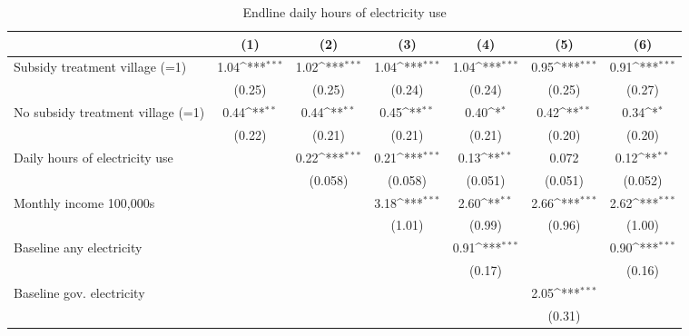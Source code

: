 \begin{table}[htbp]\centering
\def\sym#1{\ifmmode^{#1}\else\(^{#1}\)\fi}
\caption{Endline daily hours of electricity use}
\begin{tabular*}{1\hsize}{@{\hskip\tabcolsep\extracolsep\fill}l*{6}{c}}
\toprule
                &\multicolumn{1}{c}{(1)}         &\multicolumn{1}{c}{(2)}         &\multicolumn{1}{c}{(3)}         &\multicolumn{1}{c}{(4)}         &\multicolumn{1}{c}{(5)}         &\multicolumn{1}{c}{(6)}         \\
\midrule
Subsidy treatment village (=1)&     1.04\sym{***}&     1.02\sym{***}&     1.04\sym{***}&     1.04\sym{***}&     0.95\sym{***}&     0.91\sym{***}\\
                &   (0.25)         &   (0.25)         &   (0.24)         &   (0.24)         &   (0.25)         &   (0.27)         \\
No subsidy treatment village (=1)&     0.44\sym{**} &     0.44\sym{**} &     0.45\sym{**} &     0.40\sym{*}  &     0.42\sym{**} &     0.34\sym{*}  \\
                &   (0.22)         &   (0.21)         &   (0.21)         &   (0.21)         &   (0.20)         &   (0.20)         \\
Daily hours of electricity use&                  &     0.22\sym{***}&     0.21\sym{***}&     0.13\sym{**} &    0.072         &     0.12\sym{**} \\
                &                  &  (0.058)         &  (0.058)         &  (0.051)         &  (0.051)         &  (0.052)         \\
Monthly income 100,000s&                  &                  &     3.18\sym{***}&     2.60\sym{**} &     2.66\sym{***}&     2.62\sym{***}\\
                &                  &                  &   (1.01)         &   (0.99)         &   (0.96)         &   (1.00)         \\
Baseline any electricity&                  &                  &                  &     0.91\sym{***}&                  &     0.90\sym{***}\\
                &                  &                  &                  &   (0.17)         &                  &   (0.16)         \\
Baseline gov. electricity&                  &                  &                  &                  &     2.05\sym{***}&                  \\
                &                  &                  &                  &                  &   (0.31)         &                  \\

\end{tabular*}
\end{table}
